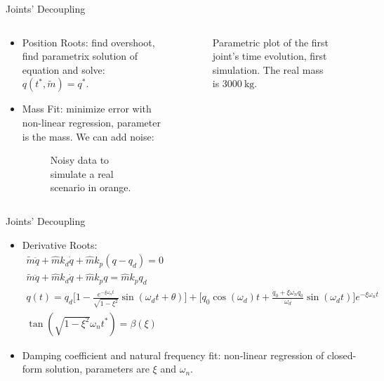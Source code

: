 \begin{frame}{Joints' Decoupling}
  \begin{columns}
    \begin{column}{0.5\textwidth}
      \begin{itemize}
        \item Position Roots: find overshoot, find parametrix solution of equation and solve: $q(t^*,\tilde{m})=q^*$.
        \item Mass Fit: minimize error with non-linear regression, parameter is the mass. We can add noise:
        \vspace{2mm}
        \begin{figure}
          \centering
          
          \caption{Noisy data to simulate a real scenario in orange.}
        \end{figure}
      \end{itemize}
    \end{column}
    \begin{column}{0.5\textwidth}
      \begin{figure}
        \centering
        
        \caption{Parametric plot of the first joint's time evolution, first simulation. The real mass is $\SI{3000}{\kilogram}$.}
      \end{figure}
    \end{column}
  \end{columns}
\end{frame}

\begin{frame}{Joints' Decoupling}
  \begin{itemize}
    \item Derivative Roots:
    \begin{equation}
      \begin{array}{c}
        \tilde{m}\ddot{q}+\hat{m}k_d\dot{q}+\hat{m}k_p (q-q_d)=0\\
        \tilde{m}\ddot{q}+\hat{m}k_d\dot{q}+\hat{m}k_p q=\hat{m}k_pq_d\\
        q(t)=q_d\Big[1-\frac{e^{-\xi\omega_nt}}{\sqrt{1-\xi^2}}\sin{(\omega_dt+\theta)}\Big]+\Big[q_0\cos{(\omega_d)t}+\frac{\dot{q}_0+\xi\omega_n q_0}{\omega_d}\sin{(\omega_dt)}\Big]e^{-\xi \omega_n t}\\
        \tan{(\sqrt{1-\xi^2}\omega_nt^*)}=\beta(\xi)
      \end{array}
    \end{equation}
    \item Damping coefficient and natural frequency fit: non-linear regression of closed-form solution, parameters are $\xi$ and $\omega_n$.
  \end{itemize}
\end{frame}

